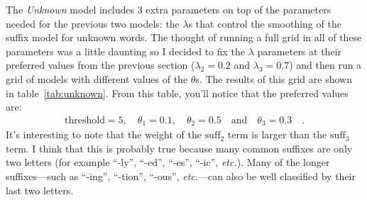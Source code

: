 \documentclass[11pt]{article}
\begin{document}
The \emph{Unknown} model includes 3 extra parameters on top of the parameters
needed for the previous two models: the $\lambda$s that control the smoothing
of the suffix model for unknown words.
The thought of running a full grid in all of these parameters was a little
daunting so I decided to fix the $\lambda$ parameters at their preferred
values from the previous section ($\lambda_2 = 0.2$ and $\lambda_3 = 0.7$) and
then run a grid of models with different values of the $\theta$s.
The results of this grid are shown in table~\ref{tab:unknown}.
From this table, you'll notice that the preferred values are:
\begin{eqnarray}
\mathrm{threshold} = 5,\quad\theta_1 = 0.1,\quad\theta_2 = 0.5\quad
\mbox{and}\quad \theta_3 = 0.3\quad.
\end{eqnarray}
It's interesting to note that the weight of the $\mathrm{suff}_2$ term is
larger than the $\mathrm{suff}_3$ term.
I think that this is probably true because many common suffixes are only two
letters (for example ``-ly'', ``-ed'', ``-es'', ``-ic'', \emph{etc.}).
Many of the longer suffixes---such as ``-ing'', ``-tion'', ``-ous'',
\emph{etc.}---can also be well classified by their last two letters.
\end{document}
